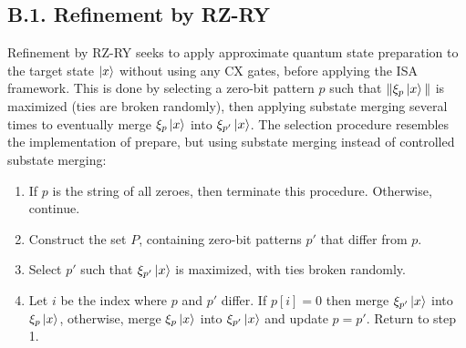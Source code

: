 \subsection*{B.1. Refinement by RZ-RY}
Refinement by RZ-RY seeks to apply approximate quantum state preparation to the
target state $\mathinner{|{x}\rangle}$ without using any CX gates, before applying the ISA
framework. This is done by selecting a zero-bit pattern $p$ such that
$\| \xi_p\mathinner{|{x}\rangle} \|$ is maximized (ties are broken randomly), then applying substate
merging several times to eventually merge $\xi_p\mathinner{|{x}\rangle}$ into $\xi_{p'}\mathinner{|{x}\rangle}$. The
selection procedure resembles the implementation of prepare, but using substate
merging instead of controlled substate merging:
\begin{enumerate}
\item If $p$ is the string of all zeroes, then terminate this procedure.
Otherwise, continue.
\item Construct the set $P$, containing zero-bit patterns $p'$ that differ from
$p$.
\item Select $p'$ such that $\xi_{p'}\mathinner{|{x}\rangle}$ is maximized, with ties broken
randomly.
\item Let $i$ be the index where $p$ and $p'$ differ. If $p[i] = 0$ then merge
$\xi_{p'}\mathinner{|{x}\rangle}$ into $\xi_p\mathinner{|{x}\rangle}$, otherwise, merge $\xi_p\mathinner{|{x}\rangle}$ into $\xi_{p'}\mathinner{|{x}\rangle}$
and update $p = p'$. Return to step 1.
\end{enumerate}

